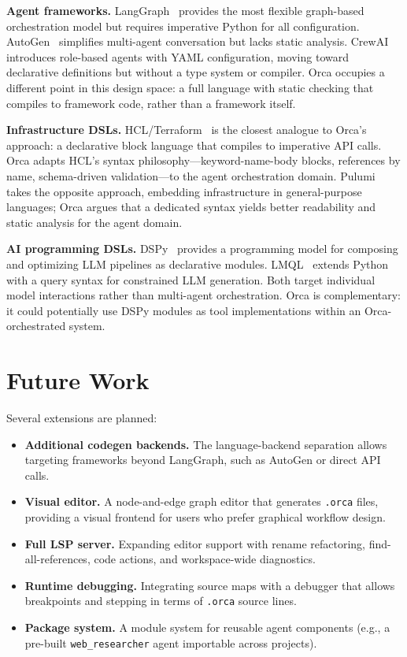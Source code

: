 \documentclass[sigconf,nonacm]{acmart}
\begin{document}
\noindent\textbf{Agent frameworks.}
LangGraph~\cite{langgraph} provides the most flexible graph-based
orchestration model but requires imperative Python for all configuration.
AutoGen~\cite{autogen} simplifies multi-agent conversation but lacks
static analysis. CrewAI~\cite{crewai} introduces role-based agents with
YAML configuration, moving toward declarative definitions but without a
type system or compiler. Orca occupies a different point in this design
space: a full language with static checking that compiles to framework
code, rather than a framework itself.

\noindent\textbf{Infrastructure DSLs.}
HCL/Terraform~\cite{terraform} is the closest analogue to Orca's approach:
a declarative block language that compiles to imperative API calls. Orca
adapts HCL's syntax philosophy---keyword-name-body blocks, references by
name, schema-driven validation---to the agent orchestration domain. Pulumi
takes the opposite approach, embedding infrastructure in general-purpose
languages; Orca argues that a dedicated syntax yields better readability
and static analysis for the agent domain.

\noindent\textbf{AI programming DSLs.}
DSPy~\cite{dspy} provides a programming model for composing and optimizing
LLM pipelines as declarative modules. LMQL~\cite{lmql} extends Python with
a query syntax for constrained LLM generation. Both target individual
model interactions rather than multi-agent orchestration. Orca is
complementary: it could potentially use DSPy modules as tool
implementations within an Orca-orchestrated system.

\section{Future Work}
\label{sec:future}

Several extensions are planned:

\begin{itemize}[leftmargin=*]
  \item \textbf{Additional codegen backends.} The language-backend separation
        allows targeting frameworks beyond LangGraph, such as AutoGen or
        direct API calls.
  \item \textbf{Visual editor.} A node-and-edge graph editor that generates
        \texttt{.orca} files, providing a visual frontend for users who prefer
        graphical workflow design.
  \item \textbf{Full LSP server.} Expanding editor support with rename
        refactoring, find-all-references, code actions, and workspace-wide
        diagnostics.
  \item \textbf{Runtime debugging.} Integrating source maps with a debugger
        that allows breakpoints and stepping in terms of \texttt{.orca}
        source lines.
  \item \textbf{Package system.} A module system for reusable agent
        components (e.g., a pre-built \texttt{web\_researcher} agent
        importable across projects).
\end{itemize}
\end{document}
